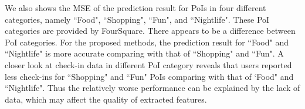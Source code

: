 We also shows the MSE of the prediction result for PoIs in four different categories, namely ``Food", ``Shopping", ``Fun", and ``Nightlife". These PoI categories are provided by FourSquare. There appears to be a difference between PoI categories. For the proposed methods, the prediction result for ``Food" and ``Nightlife" is more accurate comparing with that of ``Shopping" and ``Fun". A closer look at check-in data in different PoI category reveals that users reported less check-ins for ``Shopping" and ``Fun" PoIs comparing with that of `Food" and ``Nightlife". Thus the relatively worse performance can be explained by the lack of data, which may affect the quality of extracted features.































